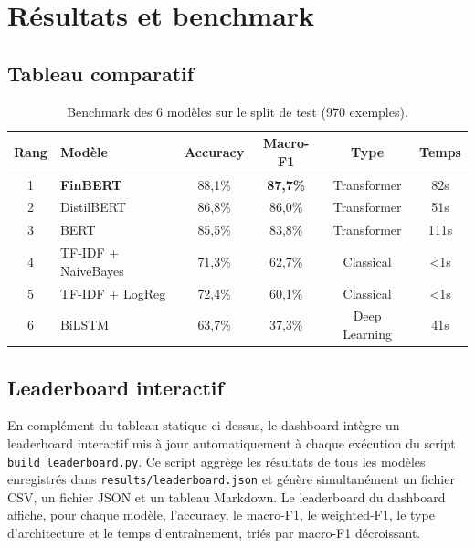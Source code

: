 \documentclass[12pt, a4paper]{article}
\begin{document}
\section{Résultats et benchmark}

\subsection{Tableau comparatif}

\begin{table}[h]
  \centering
  \begin{tabular}{clcccc}
    \toprule
    Rang & Modèle & Accuracy & Macro-F1 & Type & Temps \\
    \midrule
    1 & \textbf{FinBERT}    & 88,1\% & \textbf{87,7\%} & Transformer   & 82s  \\
    2 & DistilBERT           & 86,8\% & 86,0\%           & Transformer   & 51s  \\
    3 & BERT                 & 85,5\% & 83,8\%           & Transformer   & 111s \\
    4 & TF-IDF + NaiveBayes  & 71,3\% & 62,7\%           & Classical     & <1s  \\
    5 & TF-IDF + LogReg      & 72,4\% & 60,1\%           & Classical     & <1s  \\
    6 & BiLSTM               & 63,7\% & 37,3\%           & Deep Learning & 41s  \\
    \bottomrule
  \end{tabular}
  \caption{Benchmark des 6 modèles sur le split de test (970 exemples).}
\end{table}

\subsection{Leaderboard interactif}

En complément du tableau statique ci-dessus, le dashboard intègre un leaderboard
interactif mis à jour automatiquement à chaque exécution du script
\texttt{build\_leaderboard.py}. Ce script aggrège les résultats de tous les modèles
enregistrés dans \texttt{results/leaderboard.json} et génère simultanément un
fichier CSV, un fichier JSON et un tableau Markdown. Le leaderboard du dashboard
affiche, pour chaque modèle, l'accuracy, le macro-F1, le weighted-F1, le type
d'architecture et le temps d'entraînement, triés par macro-F1 décroissant.
\end{document}
